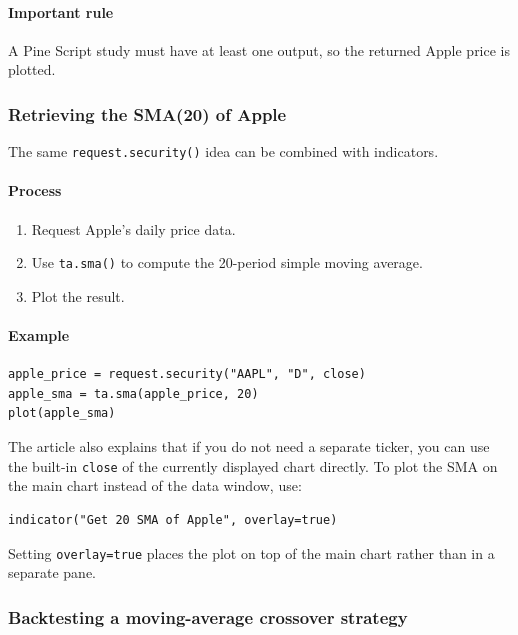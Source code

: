 \documentclass[12pt,openany]{book}
\begin{document}
\paragraph{Important rule}

A Pine Script study must have at least one output, so the returned Apple price is plotted.

\subsubsection{Retrieving the SMA(20) of Apple}

The same \texttt{request.security()} idea can be combined with indicators.

\paragraph{Process}

\begin{enumerate}[leftmargin=*]
    \item Request Apple's daily price data.
    \item Use \texttt{ta.sma()} to compute the 20-period simple moving average.
    \item Plot the result.
\end{enumerate}

\paragraph{Example}

\begin{Verbatim}[breaklines=true,breakanywhere=true,fontsize=\small]
apple_price = request.security("AAPL", "D", close)
apple_sma = ta.sma(apple_price, 20)
plot(apple_sma)
\end{Verbatim}

The article also explains that if you do not need a separate ticker, you can use the built-in \texttt{close} of the currently displayed chart directly. To plot the SMA on the main chart instead of the data window, use:

\begin{Verbatim}[breaklines=true,breakanywhere=true,fontsize=\small]
indicator("Get 20 SMA of Apple", overlay=true)
\end{Verbatim}

Setting \texttt{overlay=true} places the plot on top of the main chart rather than in a separate pane.

\subsubsection{Backtesting a moving-average crossover strategy}
\end{document}

